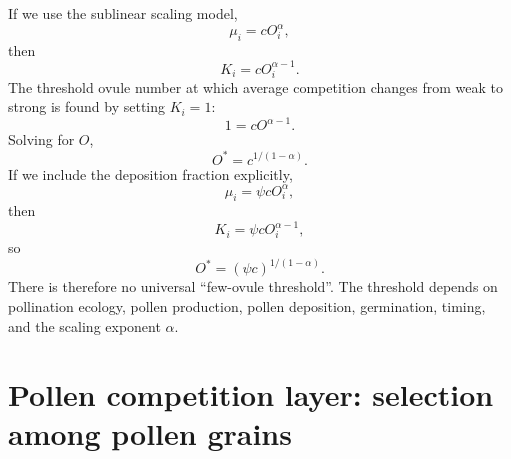 \documentclass[11pt]{article}
\begin{document}
If we use the sublinear scaling model,
\begin{equation}
\mu_i = cO_i^{\alpha},
\end{equation}
then
\begin{equation}
K_i = cO_i^{\alpha-1}.
\end{equation}
The threshold ovule number at which average competition changes from weak to strong is found by setting \(K_i=1\):
\begin{equation}
1 = cO^{\alpha-1}.
\end{equation}
Solving for \(O\),
\begin{equation}
O^* = c^{1/(1-\alpha)}.
\label{eq:threshold_simple}
\end{equation}
If we include the deposition fraction explicitly,
\begin{equation}
\mu_i = \psi cO_i^{\alpha},
\end{equation}
then
\begin{equation}
K_i = \psi cO_i^{\alpha-1},
\end{equation}
so
\begin{equation}
O^* = (\psi c)^{1/(1-\alpha)}.
\label{eq:threshold_psi}
\end{equation}
There is therefore no universal ``few-ovule threshold''. The threshold depends on pollination ecology, pollen production, pollen deposition, germination, timing, and the scaling exponent \(\alpha\).

\section{Pollen competition layer: selection among pollen grains}
\end{document}
